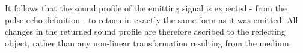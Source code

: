 












It follows that the sound profile of the emitting signal is expected - from the pulse-echo definition -
to return in exactly the same form as it was emitted.
All changes in the returned sound profile are therefore ascribed to the reflecting object,
rather than any non-linear transformation resulting from the medium.


